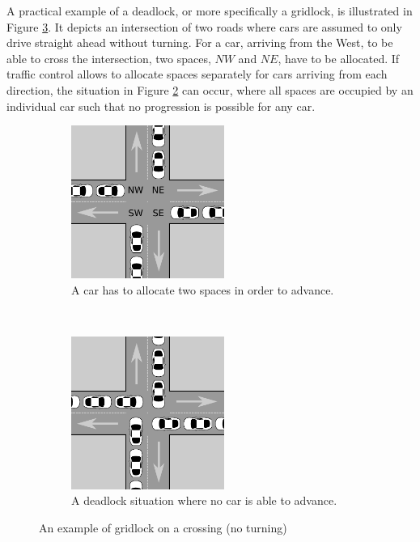 A practical example of a deadlock, or more specifically a gridlock, is illustrated in Figure \ref{fig_cross_sync}.
It depicts an intersection of two roads where cars are assumed to only drive straight ahead without turning.
For a car, \eg arriving from the West, to be able to cross the intersection, two spaces, \eg $NW$ and $NE$, have to be allocated.
If traffic control allows to allocate spaces separately for cars arriving from each direction, the situation in Figure \ref{fig_cross_sync_b} can occur, where all spaces are occupied by an individual car such that no progression is possible for any car.
\begin{figure}[bht]
    \TopFigSpace
    \centering
    \begin{subfigure}[t]{0.45\linewidth}
        \centering
        \includegraphics[width=5cm]{fig/cross_sync_a.pdf}
        \CaptionFigSpace
        \caption{A car has to allocate two spaces in order to advance.}
        \label{fig_cross_sync_a}
    \end{subfigure}
    ~
    \begin{subfigure}[t]{0.45\linewidth}
        \centering
        \includegraphics[width=5cm]{fig/cross_sync_b.pdf}
        \CaptionFigSpace
        \caption{A deadlock situation where no car is able to advance.}
        \label{fig_cross_sync_b}
    \end{subfigure}
    \caption{An example of gridlock on a crossing (no turning)}
    \label{fig_cross_sync}
    \BotFigSpace
\end{figure}

